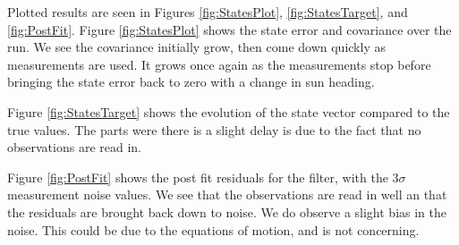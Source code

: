 \documentclass[]{BasiliskReportMemo}
\begin{document}
Plotted results are seen in Figures \ref{fig:StatesPlot}, \ref{fig:StatesTarget}, and \ref{fig:PostFit}. Figure \ref{fig:StatesPlot} shows the state error and covariance over the run. We see the covariance initially grow, then come down quickly as measurements are used. It grows once again as the measurements stop before bringing the state error back to zero with a change in sun heading. 

Figure \ref{fig:StatesTarget} shows the evolution of the state vector compared to the true values. The parts were there is a slight delay is due to the fact that no observations are read in. 

Figure \ref{fig:PostFit} shows the post fit residuals for the filter, with the $3\sigma$ measurement noise values. We see that the observations are read in well an that the residuals are brought back down to noise. We do observe a slight bias in the noise. This could be due to the equations of motion, and is not concerning.





\end{document}
